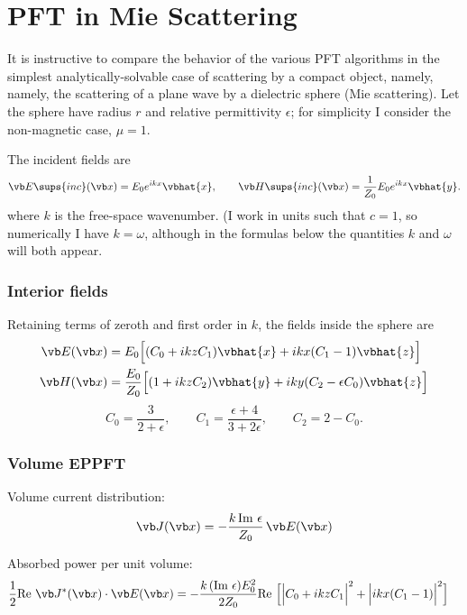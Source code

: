 \newpage
\section{PFT in Mie Scattering}

It is instructive to compare the behavior of the various 
PFT algorithms in the simplest analytically-solvable
case of scattering by a compact object, namely,
namely, the scattering of a plane wave by a dielectric 
sphere (Mie scattering). Let the sphere have radius $r$
and relative permittivity $\epsilon$; for simplicity
I consider the non-magnetic case, $\mu=1.$

The incident fields are 
$$ \vb E\sups{inc}(\vb x) = E_0 e^{ikx} \vbhat{x}, \qquad
   \vb H\sups{inc}(\vb x) = \frac{1}{Z_0} E_0 e^{ikx} \vbhat{y}.
$$
where $k$ is the free-space wavenumber. (I work in units
such that $c=1$, so numerically I have $k=\omega$, although
in the formulas below the quantities $k$ and $\omega$ will
both appear.

\subsubsection*{Interior fields}

Retaining terms of zeroth and first order in $k$, the fields
inside the sphere are
\begin{align*}
     \vb E(\vb x) 
&= 
 E_0 \Big[ (C_0 + ikz C_1) \vbhat{x} +ikx(C_1-1)\vbhat{z} \Big]
\\
     \vb H(\vb x) 
&= 
 \frac{E_0}{Z_0}
     \Big[ (1 + ikzC_2) \vbhat{y} +iky(C_2-\epsilon C_0)\vbhat{z}
     \Big]
\end{align*}
$$ C_0=\frac{3}{2+\epsilon}, \qquad 
   C_1=\frac{\epsilon+4}{3+2\epsilon}, \qquad
   C_2=2-C_0.
$$

\subsubsection*{Volume EPPFT}

Volume current distribution: 
$$ \vb J(\vb x)=-\frac{k\, \text{Im }\epsilon}{Z_0} \, \vb E(\vb x) $$

Absorbed power per unit volume:
\begin{align*}
 \frac{1}{2} \text{Re }\vb J^*(\vb x) \cdot \vb E(\vb x)
&= -\frac{k \, (\text{Im } \epsilon) E_0^2 }{2 Z_0} \text{Re }\Big[
  \Big|C_0 + ikz C_1\Big|^2 + \Big|ikx(C_1-1)\Big|^2
  \Big]
\end{align*}

